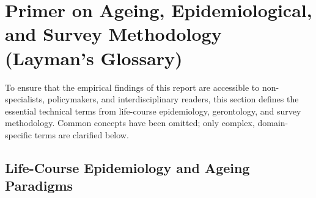 \documentclass[11pt,a4paper]{article}
\begin{document}
\section{Primer on Ageing, Epidemiological, and Survey Methodology (Layman's Glossary)}

To ensure that the empirical findings of this report are accessible to non-specialists, policymakers, and interdisciplinary readers, this section defines the essential technical terms from life-course epidemiology, gerontology, and survey methodology. Common concepts have been omitted; only complex, domain-specific terms are clarified below.

\subsection{Life-Course Epidemiology and Ageing Paradigms}
\end{document}
